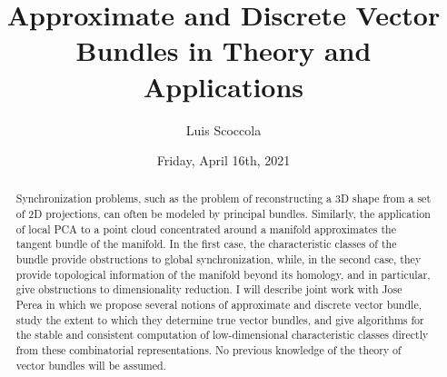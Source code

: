 \documentclass{UAmathtalk}
\author{Luis Scoccola}
\title{Approximate and Discrete Vector Bundles in Theory and Applications}
\date{Friday, April 16th, 2021}
\begin{document}
\maketitle

\begin{abstract}
Synchronization problems, such as the problem of reconstructing a 3D shape from a set of 2D projections, can often be modeled by principal bundles. Similarly, the application of local PCA to a point cloud concentrated around a manifold approximates the tangent bundle of the manifold. In the first case, the characteristic classes of the bundle provide obstructions to global synchronization, while, in the second case, they provide topological information of the manifold beyond its homology, and in particular, give obstructions to dimensionality reduction. I will describe joint work with Jose Perea in which we propose several notions of approximate and discrete vector bundle, study the extent to which they determine true vector bundles, and give algorithms for the stable and consistent computation of low-dimensional characteristic classes directly from these combinatorial representations. No previous knowledge of the theory of vector bundles will be assumed.
\end{abstract}
\end{document}
